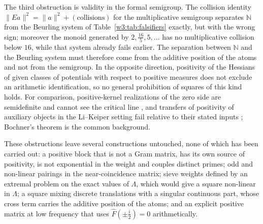\documentclass[11pt]{amsart}
\theoremstyle{definition}
\theoremstyle{remark}
\numberwithin{equation}{section}
\newcommand{\N}{\mathbb{N}}
\newcommand{\Fh}{\widehat F}                           %
\begin{document}
The third obstruction is validity in the formal semigroup. The collision identity
$\|Ea\|^2=\|a\|^2+(\text{collisions})$ for the multiplicative semigroup separates $\N$ from the Beurling system of
Table~\ref{w3:tab:falsifiers} exactly, but with the wrong sign; moreover the monoid generated by $2,\frac{16}5,5,\dots$
has no multiplicative collision below $16$, while that system already fails earlier. The separation between $\N$ and
the Beurling system must therefore come from the additive position of the atoms and not from the semigroup. In the
opposite direction, positivity of the Hessians of given classes of potentials with respect to positive measures does not
exclude an arithmetic identification, so no general prohibition of squares of this kind holds. For comparison,
positive-kernel realizations of the zero side are semidefinite and cannot see the critical line
\cite[Theorems~5.1--5.3]{P18}, and transfers of positivity of auxiliary objects in the Li--Keiper setting fail relative to
their stated inputs \cite{P37}; Bochner's theorem \cite{Bochner1932} is the common background.

These obstructions leave several constructions untouched, none of which has been carried out: a positive block that is
not a Gram matrix, has its own source of positivity, is not exponential in the weight and couples distinct primes; odd
and non-linear pairings in the near-coincidence matrix; sieve weights defined by an extremal problem on the exact values
of $\Lambda$, which would give a square non-linear in $\Lambda$; a square mixing discrete translations with a singular
continuous part, whose cross term carries the additive position of the atoms; and an explicit positive matrix at low
frequency that uses $\Fh(\pm\frac i2)=0$ arithmetically.
\end{document}
